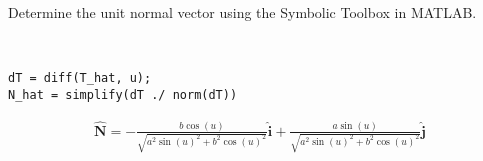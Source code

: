 Determine the unit normal vector using the Symbolic Toolbox in MATLAB.

\begin{solution} \
\begin{lstlisting}
dT = diff(T_hat, u);
N_hat = simplify(dT ./ norm(dT))
\end{lstlisting}

\begin{align*}
    \boldsymbol{\hat{N}} = -\frac{b \cos (u)}{\sqrt{a^{2} \sin (u)^{2}+b^{2} \cos (u)^{2}}} \hat{\boldsymbol{i}} + \frac{a \sin (u)}{\sqrt{a^{2} \sin (u)^{2}+b^{2} \cos (u)^{2}}} \hat{\boldsymbol{j}}
\end{align*}
\end{solution}